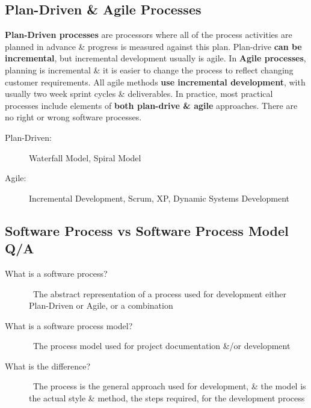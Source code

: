 \documentclass{report}
\begin{document}
\subsection{Plan-Driven \& Agile Processes}
\textbf{Plan-Driven processes} are processors where all of the process activities are planned in advance \& progress is measured against this plan. Plan-drive \textbf{can be incremental}, but incremental development usually is agile. In \textbf{Agile processes}, planning is incremental \& it is easier to change the process to reflect changing customer requirements. All agile methods \textbf{use incremental development}, with usually two week sprint cycles \& deliverables. In practice, most practical processes include elements of \textbf{both plan-drive \& agile} approaches. There are no right or wrong software processes.
\begin{description}
  \item [Plan-Driven:] Waterfall Model, Spiral Model
  \item [Agile:] Incremental Development, Scrum, XP, Dynamic Systems Development
\end{description}


\subsection{Software Process vs Software Process Model Q/A}
\begin{description}
  \item [What is a software process?] \ \newline The abstract representation of a process used for development either Plan-Driven or Agile, or a combination
  \item [What is a software process model?] \ \newline The process model used for project documentation \&/or development
  \item [What is the difference?] \ \newline The process is the general approach used for development, \& the model is the actual style \& method, the steps required, for the development process
\end{description}
\end{document}
